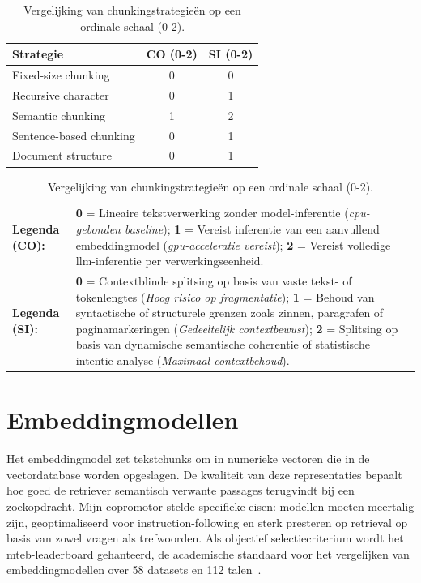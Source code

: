 \begin{table}[ht]
\centering
\small
\begin{tabular}{lcc}
\toprule
\textbf{Strategie} & \textbf{CO (0-2)} & \textbf{SI (0-2)} \\
\midrule
Fixed-size chunking     & 0 & 0 \\
Recursive character     & 0 & 1 \\
Semantic chunking       & 1 & 2 \\
Sentence-based chunking & 0 & 1 \\
Document structure      & 0 & 1 \\
\bottomrule
\end{tabular}
\caption[Evaluatie van chunkingstrategieën op basis van overhead en semantiek.]{\label{tab:longlist-chunking-tabel}Vergelijking van chunkingstrategieën op een ordinale schaal (0-2).}
\vspace{2mm}
\centering
\footnotesize
\begin{tabular}{lp{12.5cm}}
\textbf{Legenda (CO):} & \textbf{0} = Lineaire tekstverwerking zonder model-inferentie (\textit{\gls{cpu}-gebonden baseline}); \textbf{1} = Vereist inferentie van een aanvullend embeddingmodel (\textit{\gls{gpu}-acceleratie vereist}); \textbf{2} = Vereist volledige \gls{llm}-inferentie per verwerkingseenheid. \\
\textbf{Legenda (SI):} & \textbf{0} = Contextblinde splitsing op basis van vaste tekst- of tokenlengtes (\textit{Hoog risico op fragmentatie}); \textbf{1} = Behoud van syntactische of structurele grenzen zoals zinnen, paragrafen of paginamarkeringen (\textit{Gedeeltelijk contextbewust}); \textbf{2} = Splitsing op basis van dynamische semantische coherentie of statistische intentie-analyse (\textit{Maximaal contextbehoud}).
\end{tabular}
\end{table}

\section{Embeddingmodellen}
\label{sec:longlist-embedding}

Het embeddingmodel zet tekstchunks om in numerieke vectoren die in de vectordatabase worden opgeslagen. De kwaliteit van deze representaties bepaalt hoe goed de retriever semantisch verwante passages terugvindt bij een zoekopdracht. Mijn copromotor stelde specifieke eisen: modellen moeten meertalig zijn, geoptimaliseerd voor instruction-following en sterk presteren op retrieval op basis van zowel vragen als trefwoorden. Als objectief selectiecriterium wordt het \gls{mteb}-leaderboard gehanteerd, de academische standaard voor het vergelijken van embeddingmodellen over 58 datasets en 112 talen~\autocite{MuennighoffEtAl2023}.

